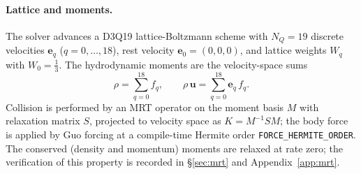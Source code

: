 \documentclass[11pt]{article}
\theoremstyle{definition}
\theoremstyle{remark}
\begin{document}
\paragraph{Lattice and moments.}
The solver advances a D3Q19 lattice-Boltzmann scheme with $N_Q=19$ discrete
velocities $\mathbf e_q$ ($q=0,\dots,18$), rest velocity
$\mathbf e_0=(0,0,0)$, and lattice weights $W_q$ with $W_0=\tfrac13$. The
hydrodynamic moments are the velocity-space sums
\begin{equation}
\rho=\sum_{q=0}^{18} f_q,
\qquad
\rho\,\mathbf u=\sum_{q=0}^{18}\mathbf e_q\,f_q .
\label{eq:moments-master}
\end{equation}
Collision is performed by an MRT operator on the moment basis $M$ with
relaxation matrix $S$, projected to velocity space as $K=M^{-1}SM$; the body
force is applied by Guo forcing \cite{GuoZhengShi2002} at a compile-time Hermite
order \texttt{FORCE\_HERMITE\_ORDER}. The conserved (density and momentum)
moments are relaxed at rate zero; the verification of this property is recorded
in \S\ref{sec:mrt} and Appendix~\ref{app:mrt}.
\end{document}
